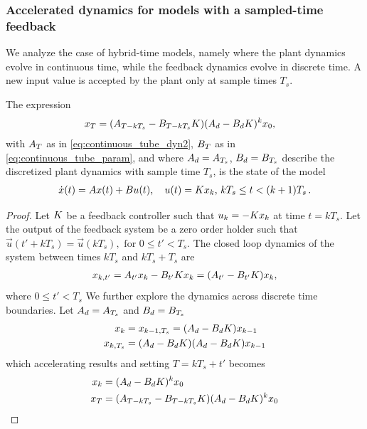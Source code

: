 \subsubsection{Accelerated dynamics for models with a sampled-time feedback}\label{sec:real_discrete_feedback_inputs}

We analyze the case of hybrid-time models, 
namely where the plant dynamics evolve in continuous time, 
while the feedback dynamics evolve in discrete time.  
A new input value is accepted by the plant only at sample times $T_s$.
%
\begin{theorem}
The expression
%
 \begin{align}
 {x}_{T} &= ({A}_{T-kT_s}-{B}_{T-kT_s}{K}) ({A}_d-{B}_d{K})^k{x}_0, 
 \label{eq:cyber_feedback}
 \end{align}
%
with ${A}_T$ as in \eqref{eq:continuous_tube_dyn2}, ${B}_T$ as in
\eqref{eq:continuous_tube_param}, and where ${A}_d={A}_{T_s}$,
${B}_d={B}_{T_s}$ describe the discretized plant dynamics with
sample time $T_s$, is the state of the model
%
\begin{align*}
 \dot{{x}}(t) = {A}{x}(t)+{B}{u}(t), \quad 
 {u}(t)={K}{x}_k,  \,
 kT_s \leq t < (k+1)T_s \,. 
\end{align*}
%
\end{theorem}
\begin{proof}
%
Let ${K}$ be a feedback controller such that
${u}_k=-{K}{x}_k$ at time $t=kT_s$.  Let the output of the
feedback system be a zero order holder such that
$\vec{u}(t'+kT_s)=\vec{u}(kT_s), \text{ for } 0 \leq t' < T_s$.  The closed
loop dynamics of the system between times $kT_s$ and $kT_s+T_s$ are
%
\begin{align*}
{x}_{k,t'}={A}_{t'}{x}_k-{B}_{t'}{K}{x}_k = ({A}_{t'}-{B}_{t'}{K}){x}_k,
\end{align*}
where $0 \leq t' < T_s$
We further explore the dynamics across discrete time boundaries. Let ${A}_d={A}_{T_s}$ and ${B}_d={B}_{T_s}$
\begin{align*}
{x}_{k}&={x}_{k-1,T_s}= ({A}_d-{B}_d{K}){x}_{k-1}\\
{x}_{k,T_s} &= ({A}_d-{B}_d{K}) ({A}_d-{B}_d{K}){x}_{k-1}
\end{align*}
which accelerating results and setting $T=kT_s+t'$ becomes
\begin{align}
\label{eq:feedback_sampled_cont}
{x}_{k} &= ({A}_d-{B}_d{K}) ^k{x}_0\\
{x}_{T} &= ({A}_{T-kT_s}-{B}_{T-kT_s}{K}) ({A}_d-{B}_d{K})^k{x}_0
\label{eq:feedback_cont}
\end{align}
\end{proof}

